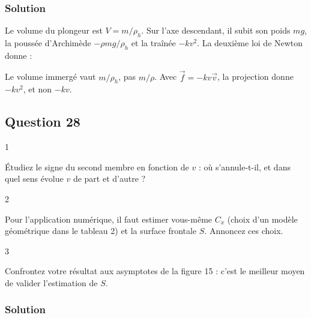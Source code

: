 \documentclass[11pt,a4paper]{article}
\newcommand{\equationajustee}[1]{%
  \sbox{\boiteequation}{$\displaystyle #1$}%
  \ifdim\wd\boiteequation>\linewidth
    \[\resizebox{\linewidth}{!}{\usebox{\boiteequation}}\]%
  \else
    \[#1\]%
  \fi}
\begin{document}
\hypertarget{solution-26}{%
\subsubsection{Solution}\label{solution-26}}

Le volume du plongeur est \(V = m/\rho_h\). Sur l'axe descendant, il subit son poids \(mg\), la poussée d'Archimède \(-\rho m g/\rho_h\) et la traînée \(-kv^2\). La deuxième loi de Newton donne :

\equationajustee{\boxed{\frac{\mathrm dv}{\mathrm dt} = g\left(1 - \frac{\rho}{\rho_h}\right) - \frac{k}{m}v^2}}

\begin{piege}

Le volume immergé vaut \(m/\rho_h\), pas \(m/\rho\). Avec \(\vec f = -kv\vec v\), la projection donne \(-kv^2\), et non \(-kv\).

\end{piege}

\hypertarget{question-28}{%
\subsection{Question 28}\label{question-28}}

\begin{indication}{1}

Étudiez le signe du second membre en fonction de \(v\) : où s'annule-t-il, et dans quel sens évolue \(v\) de part et d'autre ?

\end{indication}

\begin{indication}{2}

Pour l'application numérique, il faut estimer vous-même \(C_x\) (choix d'un modèle géométrique dans le tableau 2) et la surface frontale \(S\). Annoncez ces choix.

\end{indication}

\begin{indication}{3}

Confrontez votre résultat aux asymptotes de la figure 15 : c'est le meilleur moyen de valider l'estimation de \(S\).

\end{indication}

\hypertarget{solution-27}{%
\subsubsection{Solution}\label{solution-27}}
\end{document}

